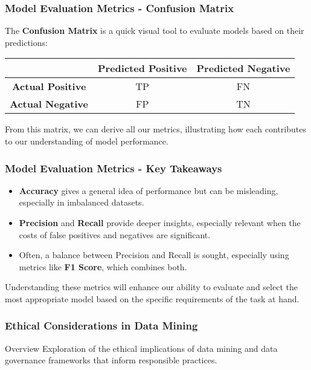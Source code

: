 \documentclass[aspectratio=169]{beamer}
\begin{document}
\begin{frame}[fragile]
    \frametitle{Model Evaluation Metrics - Confusion Matrix}
    The \textbf{Confusion Matrix} is a quick visual tool to evaluate models based on their predictions:

    \begin{center}
    \begin{tabular}{|c|c|c|}
        \hline
        & \textbf{Predicted Positive} & \textbf{Predicted Negative} \\
        \hline
        \textbf{Actual Positive} & TP & FN \\
        \hline
        \textbf{Actual Negative} & FP & TN \\
        \hline
    \end{tabular}
    \end{center}

    From this matrix, we can derive all our metrics, illustrating how each contributes to our understanding of model performance.
\end{frame}

\begin{frame}[fragile]
    \frametitle{Model Evaluation Metrics - Key Takeaways}
    \begin{itemize}
        \item \textbf{Accuracy} gives a general idea of performance but can be misleading, especially in imbalanced datasets.
        \item \textbf{Precision} and \textbf{Recall} provide deeper insights, especially relevant when the costs of false positives and negatives are significant.
        \item Often, a balance between Precision and Recall is sought, especially using metrics like \textbf{F1 Score}, which combines both.
    \end{itemize}
    Understanding these metrics will enhance our ability to evaluate and select the most appropriate model based on the specific requirements of the task at hand.
\end{frame}

\begin{frame}[fragile]
    \frametitle{Ethical Considerations in Data Mining}
    \begin{block}{Overview}
        Exploration of the ethical implications of data mining and data governance frameworks that inform responsible practices.
    \end{block}
\end{frame}
\end{document}
